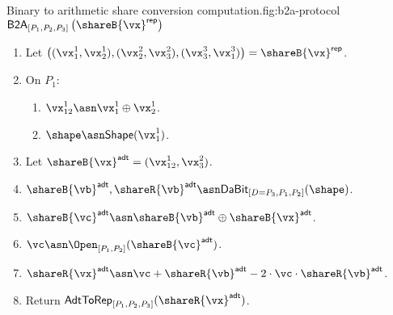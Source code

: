 \begin{Boxfig}{Binary to arithmetic share conversion computation.}{fig:b2a-protocol}
  {$\mathsf{B2A}_{[P_1, P_2, P_3]} \left( \shareB{\vx}^\mathsf{rep} \right)$}
  \begin{enumerate}
  \item Let $\left( (\vx_1^1, \vx_2^1), (\vx_2^2, \vx_3^2), (\vx_3^3, \vx_1^3) \right) = \shareB{\vx}^\mathsf{rep}$.
  \item On $P_1$:
  \begin{enumerate}
  \item $\vx^1_{12} \asn \vx_1^1 \oplus \vx_2^1$.
  \item $\shape \asn \mathsf{Shape}(\vx^1_1)$.
  \end{enumerate}
  \item Let $\shareB{\vx}^\mathsf{adt} = (\vx^1_{12}, \vx_3^2)$.
  \item $\shareB{\vb}^\mathsf{adt}, \shareR{\vb}^\mathsf{adt} \asn \textsf{DaBit}_{[D=P_3, P_1, P_2]}(\shape)$.
  \item $\shareB{\vc}^{\mathsf{adt}} \asn \shareB{\vb}^\mathsf{adt} \oplus \shareB{\vx}^{\mathsf{adt}}$.
  \item $\vc \asn \Open_{[P_1, P_2]}(\shareB{\vc}^{\mathsf{adt}})$.
  \item $\shareR{\vx}^\mathsf{adt} \asn \vc + \shareR{\vb}^{\mathsf{adt}} - 2 \cdot \vc \cdot \shareR{\vb}^{\mathsf{adt}}$.
  \item Return $\textsf{AdtToRep}_{[P_1,P_2,P_3]}(\shareR{\vx}^\mathsf{adt})$.
\end{enumerate}

\end{Boxfig}

